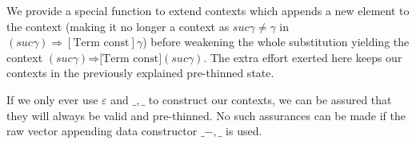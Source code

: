 
We provide a special function to extend contexts which appends a new
element to the context (making it no longer a context as $suc γ \neq γ$ in
$(suc γ) ⇒[ \mbox{Term const} ] γ$) before weakening the whole substitution
yielding the context $(suc γ) \mbox{⇒[Term const]} (suc γ)$. The extra effort
exerted here keeps our contexts in the previously explained pre-thinned state.

If we only ever use $ε$ and $\_ , \_$ to construct our contexts, we can be assured
that they will always be valid and pre-thinned. No such assurances can
be made if the raw vector appending data constructor $\_ -,\_$ is used.

\begin{code}%
\>[0]\AgdaOperator{\AgdaFunction{\AgdaUnderscore{},\AgdaUnderscore{}}}\AgdaSpace{}%
\AgdaSymbol{:}\AgdaSpace{}%
\AgdaSpace{}%
\AgdaSpace{}%
\AgdaSpace{}%
\AgdaSpace{}%
\AgdaSpace{}%
\AgdaSpace{}%
\AgdaSpace{}%
\AgdaSpace{}%
\AgdaSymbol{(}\AgdaSpace{}%
\AgdaSymbol{)}\<%
\\
\>[0]\AgdaSpace{}%
\AgdaOperator{\AgdaFunction{,}}\AgdaSpace{}%
\AgdaSpace{}%
\AgdaSymbol{=}\AgdaSpace{}%
\AgdaSymbol{(}\AgdaSpace{}%
\AgdaOperator{\AgdaInductiveConstructor{-,}}\AgdaSpace{}%
\AgdaSymbol{)}\AgdaSpace{}%
\<%
\end{code}

